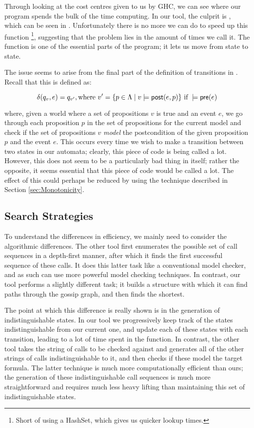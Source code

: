 \documentclass[10pt, a4paper]{report}
\begin{document}
Through looking at the cost centres given to us by GHC, we can see where our
program spends the bulk of the time computing. In our tool, the culprit is
, which can be seen in . Unfortunately
there is no more we can do to speed up this function \footnote{Short of using a
  HashSet, which gives us quicker lookup times.}, suggesting that the problem
lies in the amount of times we call it. The function is one of the essential
parts of the program; it lets us move from state to state.

The issue seems to arise from the final part of the definition of transitions in
\mestar. Recall that this is defined as:

\begin{equation} \label{eq:delta1}
  \delta(q_v, e) = q_{v'}, \text{where } v' = \{p \in \Lambda \mid v \models \textsf{post}(e, p)\}
  \text{ if } 
  \models \textsf{pre}(e)
\end{equation}

\noindent where, given a world where a set of propositions $v$ is true and an
event $e$, we go through each proposition $p$ in the set of propositions for the
current model and check if the set of propositions $v$ \emph{model} the postcondition
of the given proposition $p$ and the event $e$. This occurs every time we wish
to make a transition between two states in our automata; clearly, this piece of
code is being called a lot. However, this does not seem to be a particularly bad
thing in itself; rather the opposite, it seems essential that this piece of code
would be called a lot. The effect of this could perhaps be reduced by using the
technique described in Section \ref{sec:Monotonicity}.

\subsection{Search Strategies}

To understand the differences in efficiency, we mainly need to consider the
algorithmic differences. The other tool first enumerates the possible set of
call sequences in a depth-first manner, after which it finds the first
successful sequence of these calls. It does this latter task like a conventional
model checker, and as such can use more powerful model checking techniques. In
contrast, our tool performs a slightly different task; it builds a structure
with which it can find paths through the gossip graph, and then finds the
shortest.

The point at which this difference is really shown is in the generation of
indistinguishable states. In our tool we progressively keep track of the states
indistinguishable from our current one, and update each of these states with
each transition, leading to a lot of time spent in the  function.
In contrast, the other tool takes the string of calls to be checked against and
generates all of the other strings of calls indistinguishable to it, and then
checks if these model the target formula. The latter technique is much more
computationally efficient than ours; the generation of these indistinguishable
call sequences is much more straightforward and requires much less heavy lifting
than maintaining this set of indistinguishable states.
\end{document}
